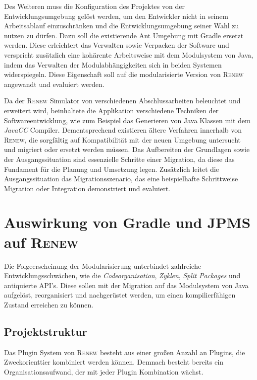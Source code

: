 	Des Weiteren muss die Konfiguration des Projektes von der Entwicklungsumgebung gelöst werden, um den Entwickler nicht in seinem Arbeitsablauf einzuschränken und die Entwicklungsumgebung seiner Wahl zu nutzen zu dürfen. Dazu soll die existierende Ant Umgebung mit Gradle ersetzt werden. Diese erleichtert das Verwalten sowie Verpacken der Software und verspricht zusätzlich eine kohärente Arbeitsweise mit dem Modulsystem von Java, indem das Verwalten der Modulabhängigkeiten sich in beiden Systemen widerspiegeln. Diese Eigenschaft soll auf die modularisierte Version von \textsc{Renew} angewandt und evaluiert werden. \bigbreak

	Da der \textsc{Renew} Simulator von verschiedenen Abschlussarbeiten beleuchtet und erweitert wird, beinhaltete die Applikation verschiedene Techniken der Softwareentwicklung, wie zum Beispiel das Generieren von Java Klassen mit dem \textit{JavaCC} Compiler. Dementsprechend existieren ältere Verfahren innerhalb von \textsc{Renew}, die sorgfältig auf Kompatibilität mit der neuen Umgebung untersucht und migriert oder ersetzt werden müssen. \bigbreak
	Das Aufbereiten der Grundlagen sowie der Ausgangssituation sind essenzielle Schritte einer Migration, da diese das Fundament für die Planung und Umsetzung legen. Zusätzlich leitet die Ausgangssituation das Migrationsszenario, das eine beispielhafte Schrittweise Migration oder Integration demonstriert und evaluiert.\bigbreak

\section{Auswirkung von Gradle und JPMS auf \textsc{Renew}} \label{sec:auswirkung}
	Die Folgeerscheinung der Modularisierung unterbindet zahlreiche Entwicklungsschwächen, wie die \textit{Codeorganisation}, \textit{Zyklen}, \textit{Split Packages} und antiquierte API's. Diese sollen mit der Migration auf das Modulsystem von Java aufgelöst, reorganisiert und nachgerüstet werden, um einen kompilierfähigen Zustand erreichen zu können.

	\subsection{Projektstruktur} \label{sub:projektstrukutr}
		Das Plugin System von \textsc{Renew} besteht aus einer großen Anzahl an Plugins, die Zweckorienttier kombiniert werden können. Demnach besteht bereits ein Organisationsaufwand, der mit jeder Plugin Kombination wächst. \bigbreak

